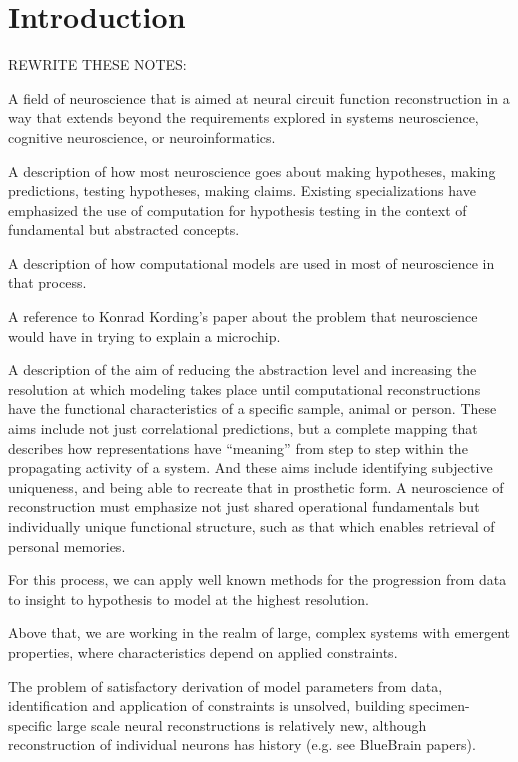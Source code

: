 \documentclass{ldr-article}
\begin{document}

\section{Introduction}

REWRITE THESE NOTES:

A field of neuroscience that is aimed at neural circuit function reconstruction in a way that extends beyond the requirements explored in systems neuroscience, cognitive neuroscience, or neuroinformatics.

A description of how most neuroscience goes about making hypotheses, making predictions, testing hypotheses, making claims.
Existing specializations have emphasized the use of computation for hypothesis testing in the context of fundamental but abstracted concepts.

A description of how computational models are used in most of neuroscience in that process.

A reference to Konrad Kording’s paper about the problem that neuroscience would have in trying to explain a microchip.

A description of the aim of reducing the abstraction level and increasing the resolution at which modeling takes place until computational reconstructions have the functional characteristics of a specific sample, animal or person. These aims include not just correlational predictions, but a complete mapping that describes how representations have “meaning” from step to step within the propagating activity of a system. And these aims include identifying subjective uniqueness, and being able to recreate that in prosthetic form.
A neuroscience of reconstruction must emphasize not just shared operational fundamentals but individually unique functional structure, such as that which enables retrieval of personal memories.

For this process, we can apply well known methods for the progression from data to insight to hypothesis to model at the highest resolution.

Above that, we are working in the realm of large, complex systems with emergent properties, where characteristics depend on applied constraints.

The problem of satisfactory derivation of model parameters from data, identification and application of constraints is unsolved, building specimen-specific large scale neural reconstructions is relatively new, although reconstruction of individual neurons has history (e.g. see BlueBrain papers).
\end{document}
